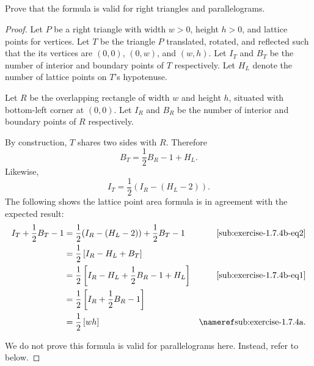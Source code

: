\documentclass{report}
\begin{document}
\subsection{}%
\label{sub:exercise-1.7.4b}

Prove that the formula is valid for right triangles and parallelograms.

\begin{proof}

  Let $P$ be a right triangle with width $w > 0$, height $h > 0$, and lattice
    points for vertices.
  Let $T$ be the triangle $P$ translated, rotated, and reflected such that the
    its vertices are $(0, 0)$, $(0, w)$, and $(w, h)$.
  Let $I_T$ and $B_T$ be the number of interior and boundary points of $T$
    respectively.
  Let $H_L$ denote the number of lattice points on $T$'s hypotenuse.

  Let $R$ be the overlapping rectangle of width $w$ and height $h$, situated
    with bottom-left corner at $(0, 0)$.
  Let $I_R$ and $B_R$ be the number of interior and boundary points
    of $R$ respectively.

  By construction, $T$ shares two sides with $R$.
  Therefore
    \begin{equation}
      \label{sub:exercise-1.7.4b-eq1}
      B_T = \frac{1}{2}B_R - 1 + H_L.
    \end{equation}
  Likewise,
    \begin{equation}
      \label{sub:exercise-1.7.4b-eq2}
      I_T = \frac{1}{2}(I_R - (H_L - 2)).
    \end{equation}
  The following shows the lattice point area formula is in agreement with
    the expected result:
    \begin{align*}
      I_T + \frac{1}{2}B_T - 1
        & = \frac{1}{2}(I_R - (H_L - 2)) + \frac{1}{2}B_T - 1
          & \eqref{sub:exercise-1.7.4b-eq2} \\
        & = \frac{1}{2}\left[ I_R - H_L + B_T \right] \\
        & = \frac{1}{2}\left[ I_R - H_L + \frac{1}{2}B_R - 1 + H_L \right]
          & \eqref{sub:exercise-1.7.4b-eq1} \\
        & = \frac{1}{2}\left[ I_R + \frac{1}{2}B_R - 1 \right] \\
        & = \frac{1}{2}\left[ wh \right] & \textref{sub:exercise-1.7.4a}.
    \end{align*}

  We do not prove this formula is valid for parallelograms here.
  Instead, refer to  below.

\end{proof}
\end{document}
